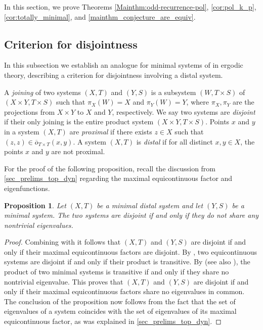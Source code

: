 \documentclass{article}
\theoremstyle{plain}
\newtheorem{proposition}[Theorem]{Proposition}
\theoremstyle{claim}
\theoremstyle{definition}
\theoremstyle{plain}
\theoremstyle{plain}
\newcommand{\1}{\boldsymbol{1}}
\newcommand{\orb}{\overline{o}}
\begin{document}
In this section, we prove Theorems \ref{Mainthm:odd-recurrence-pol}, \ref{cor:pol_k_p}, \ref{cor:totally_minimal}, and \ref{mainthm_conjecture_are_equiv}.

\subsection{Criterion for disjointness}
\label{sec_disjointness_criterion}

In this subsection we establish an analogue for minimal systems of \cite[Theorem 3.1]{Berg71} in ergodic theory, describing a criterion for disjointness involving a distal system.

A \emph{joining} of two systems $(X, T)$ and $(Y, S)$ is a subsystem $(W, T \times S)$ of $(X \times Y, T \times S)$ such that $\pi_X(W) = X$ and $\pi_Y(W) = Y$, where $\pi_X, \pi_Y$ are the projections from $X \times Y$ to $X$ and $Y$, respectively. 
We say two systems are \emph{disjoint} if their only joining is the entire product system $(X \times Y, T \times S)$.
Points $x$ and $y$ in a system $(X,T)$ are \emph{proximal} if there exists $z \in X$ such that $(z,z) \in \orb_{T \times T}(x,y)$.  
A system $(X,T)$ is \emph{distal} if for all distinct $x, y \in X$, the points $x$ and $y$ are not proximal.

For the proof of the following proposition, recall the discussion from \cref{sec_prelims_top_dyn} regarding the maximal equicontinuous factor and eigenfunctions.


\begin{proposition}\label{lem:disjoint-mef}
Let $(X, T)$ be a minimal distal system and let $(Y, S)$ be a minimal system. The two systems are disjoint if and only if they do not share any nontrivial eigenvalues.    
\end{proposition}

\begin{proof}
    Combining \cite[Chapter 11, Theorem 7]{Auslander88} with \cite[Chapter 11, Proposition 2 (ii)]{Auslander88} it follows that $(X, T)$ and $(Y, S)$ are disjoint if and only if their maximal equicontinuous factors are disjoint.      By \cite[Chapter 11, Theorem 9]{Auslander88}, two equicontinuous systems are disjoint if and only if their product is transitive.  By \cite[Theorem 5]{Peleg72} (see also \cite{MR467704}), the product of two minimal systems is transitive if and only if they share no nontrivial eigenvalue.
    This proves that $(X,T)$ and $(Y,S)$ are disjoint if and only if their maximal equicontinuous factors share no eigenvalues in common.  The conclusion of the proposition now follows from the fact that the set of eigenvalues of a system coincides with the set of eigenvalues of its maximal equicontinuous factor, as was explained in \cref{sec_prelims_top_dyn}.
\end{proof}
\end{document}
